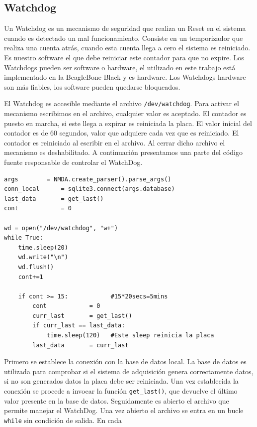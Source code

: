 	\subsection{Watchdog}
		Un Watchdog \cite{WatchDogWiki} es un mecanismo de seguridad que realiza un Reset en el sistema cuando es detectado un
		mal funcionamiento. Consiste en un temporizador que realiza una cuenta atrás, cuando esta cuenta llega a cero el sistema es reiniciado.
		Es nuestro software el que debe reiniciar este contador para que no expire. Los Watchdogs pueden ser software o hardware, el utilizado
		en este trabajo está implementado en la BeagleBone Black y es hardware. Los Watchdogs hardware son más fiables, los software pueden
		quedarse bloqueados.
		\par
		El Watchdog es accesible mediante el archivo \texttt{/dev/watchdog}. Para activar el mecanismo escribimos en el archivo, cualquier
		valor es aceptado. El contador es puesto en marcha, si este llega a expirar es reiniciada la placa. El valor inicial del contador es
		de 60 segundos, valor que adquiere cada vez que es reiniciado. El contador es reiniciado al escribir en el archivo. Al cerrar dicho
		archivo el mecanismo es deshabilitado. A continuación presentamos una parte del código fuente responsable de controlar el WatchDog.
		\begin{lstlisting}[style=myPython]
args		= NMDA.create_parser().parse_args()
conn_local      = sqlite3.connect(args.database)
last_data       = get_last()
cont            = 0

wd = open("/dev/watchdog", "w+")
while True:
    time.sleep(20)
    wd.write("\n")
    wd.flush()
    cont+=1

    if cont >= 15:            #15*20secs=5mins
        cont            = 0
        curr_last       = get_last()
        if curr_last == last_data:
            time.sleep(120)   #Este sleep reinicia la placa
        last_data       = curr_last
		\end{lstlisting}
		\par
		Primero se establece la conexión con la base de datos local. La base de datos es utilizada para comprobar si el sistema de adquisición
		genera correctamente datos, si no son generados datos la placa debe ser reiniciada. Una vez establecida la conexión se procede a
		invocar la función \texttt{get\_last()}, que devuelve el último valor presente en la base de datos. Seguidamente es abierto el archivo
		que permite manejar el WatchDog. Una vez abierto el archivo se entra en un bucle \texttt{while} sin condición de salida. En cada
